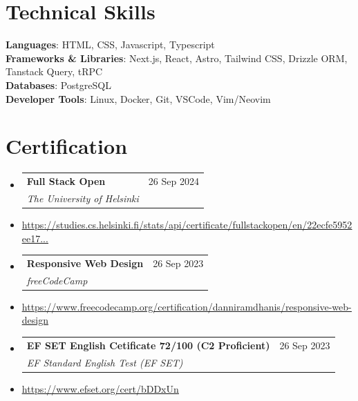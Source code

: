 \documentclass[letterpaper,11pt]{article}
\makeatletter
\newcommand{\resumeItem}[1]{
  \item\small{
    {#1 \vspace{-2pt}}
  }
}
\newcommand{\resumeSubheading}[4]{
  \vspace{-2pt}\item
    \begin{tabular*}{0.97\textwidth}[t]{l@{\extracolsep{\fill}}r}
      \textbf{#1} & #2 \\
      \textit{\small#3} & \textit{\small #4} \\
    \end{tabular*}\vspace{-7pt}
}
\newcommand{\resumeSubHeadingListStart}{\begin{itemize}[leftmargin=0.15in, label={}]}
\newcommand{\resumeSubHeadingListEnd}{\end{itemize}}
\makeatother
\begin{document}
\section{Technical Skills}
\begin{itemize}[leftmargin=0.15in, label={}]
  \small{\item{
        \textbf{Languages}{: HTML, CSS, Javascript, Typescript} \\
        \textbf{Frameworks \& Libraries}{: Next.js, React, Astro, Tailwind CSS, Drizzle ORM, Tanstack Query, tRPC} \\
        \textbf{Databases}{: PostgreSQL} \\
        \textbf{Developer Tools}{: Linux, Docker, Git, VSCode, Vim/Neovim} \\
        }}
\end{itemize}

\section{Certification}
\resumeSubHeadingListStart
\resumeSubheading
{Full Stack Open}{\small 26 Sep 2024}
{The University of Helsinki}{}
\resumeItem{\footnotesize \href{https://studies.cs.helsinki.fi/stats/api/certificate/fullstackopen/en/22ecfe5952ee17949bee3f3a79dbbbd6}{\small\ul {https://studies.cs.helsinki.fi/stats/api/certificate/fullstackopen/en/22ecfe5952ee17...}}} \\ [0.8em]
\resumeSubheading
{Responsive Web Design}{\small 26 Sep 2023}
{freeCodeCamp}{}
\resumeItem{\footnotesize \href{https://www.freecodecamp.org/certification/danniramdhanis/responsive-web-design}{\small\ul {https://www.freecodecamp.org/certification/danniramdhanis/responsive-web-design}}} \\ [0.8em]
\resumeSubheading
{EF SET English Cetificate 72/100 (C2 Proficient)}{\small 26 Sep 2023}
{EF Standard English Test (EF SET)}{}
\resumeItem{\footnotesize \href{https://www.efset.org/cert/bDDxUn}{\small\ul {https://www.efset.org/cert/bDDxUn}}}
\resumeSubHeadingListEnd


\end{document}
